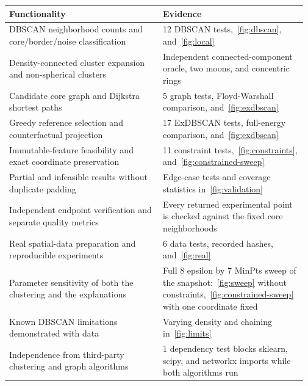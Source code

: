 \documentclass[14pt,a4paper,landscape]{extarticle}
\begin{document}
{
    \fontsize{12}{14.5}\selectfont
    \begin{longtable}[]{@{}p{0.50\linewidth}p{0.47\linewidth}@{}}
        \toprule\noalign{}
        Functionality                                                   & Evidence       \\
        \midrule\noalign{}
        \endhead
        \bottomrule\noalign{}
        \endlastfoot
        DBSCAN neighborhood counts and core/border/noise classification & 12
        DBSCAN tests,~\cref{fig:dbscan}, and~\cref{fig:local}                            \\
        Density-connected cluster expansion and non-spherical clusters  &
        Independent connected-component oracle, two moons, and concentric
        rings                                                                            \\
        Candidate core graph and Dijkstra shortest paths                & 5 graph tests,
        Floyd-Warshall comparison, and~\cref{fig:exdbscan}                               \\
        Greedy reference selection and counterfactual projection        & 17 ExDBSCAN
        tests, full-energy comparison, and~\cref{fig:exdbscan}                           \\
        Immutable-feature feasibility and exact coordinate preservation & 11
        constraint tests,~\cref{fig:constraints}, and~\cref{fig:constrained-sweep}         \\
        Partial and infeasible results without duplicate padding        & Edge-case
        tests and coverage statistics in~\cref{fig:validation}                           \\
        Independent endpoint verification and separate quality metrics  & Every
        returned experimental point is checked against the fixed core
        neighborhoods                                                                    \\
        Real spatial-data preparation and reproducible experiments      & 6 data
        tests, recorded hashes, and~\cref{fig:real}                                      \\
        Parameter sensitivity of both the clustering and the explanations & Full
        8 epsilon by 7 MinPts sweep of the snapshot:~\cref{fig:sweep} without
        constraints,~\cref{fig:constrained-sweep} with one coordinate fixed               \\
        Known DBSCAN limitations demonstrated with data                 & Varying
        density and chaining in~\cref{fig:limits}                                        \\
        Independence from third-party clustering and graph algorithms   & 1
        dependency test blocks sklearn, scipy, and networkx imports while both
        algorithms run                                                                   \\
    \end{longtable}
}
\end{document}

